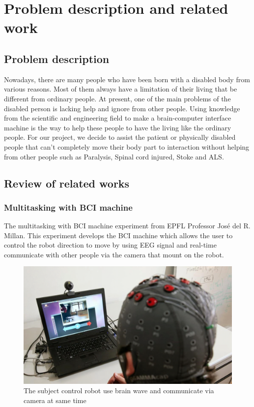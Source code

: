 \chapter{Problem description and related work}

\label{ch:Problem description and related work}

\setlength{\parindent}{4em}
\setlength{\parskip}{1em}
\renewcommand{\baselinestretch}{1.5}

\section{Problem description}
\hspace{1.5cm} Nowadays, there are many people who have been born with a disabled body from various reasons. Most of them always have a limitation of their living that be different from ordinary people. At present, one of the main problems of the disabled person is lacking help and ignore from other people. Using knowledge from the scientific and engineering field to make a brain-computer interface machine is the way to help these people to have the living like the ordinary people. For our project, we decide to assist the patient or physically disabled people that can't completely move their body part to interaction without helping from other people such as Paralysis, Spinal cord injured, Stoke and ALS.

\section{Review of related works}
\subsection {Multitasking with BCI machine\cite{ref1}}
\hspace{1.5cm} The multitasking with BCI machine experiment from EPFL Professor José del R. Millan. This experiment develops the BCI machine which allows the user to control the robot direction to move by using EEG signal and real-time communicate with other people via the camera that mount on the robot.
\begin{figure}[ht]
	\centering
  	\includegraphics[scale = 0.4]{chapter2/21.pdf}
  	\caption{The subject control robot use brain wave and communicate via camera at same time}
\end{figure}

